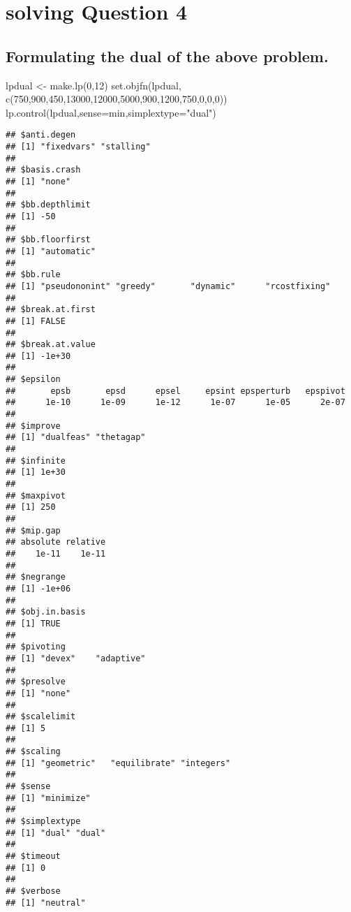 \documentclass[
]{article}
\newenvironment{Shaded}{\begin{snugshade}}{\end{snugshade}}
\newcommand{\AttributeTok}[1]{\textcolor[rgb]{0.77,0.63,0.00}{#1}}
\newcommand{\DecValTok}[1]{\textcolor[rgb]{0.00,0.00,0.81}{#1}}
\newcommand{\FunctionTok}[1]{\textcolor[rgb]{0.00,0.00,0.00}{#1}}
\newcommand{\NormalTok}[1]{#1}
\newcommand{\OtherTok}[1]{\textcolor[rgb]{0.56,0.35,0.01}{#1}}
\newcommand{\StringTok}[1]{\textcolor[rgb]{0.31,0.60,0.02}{#1}}
\begin{document}
\hypertarget{solving-question-4}{%
\section{solving Question 4}\label{solving-question-4}}

\hypertarget{formulating-the-dual-of-the-above-problem.}{%
\subsection{Formulating the dual of the above
problem.}\label{formulating-the-dual-of-the-above-problem.}}

\begin{Shaded}
\begin{Highlighting}[]
\NormalTok{lpdual }\OtherTok{\textless{}{-}} \FunctionTok{make.lp}\NormalTok{(}\DecValTok{0}\NormalTok{,}\DecValTok{12}\NormalTok{)}
\FunctionTok{set.objfn}\NormalTok{(lpdual, }\FunctionTok{c}\NormalTok{(}\DecValTok{750}\NormalTok{,}\DecValTok{900}\NormalTok{,}\DecValTok{450}\NormalTok{,}\DecValTok{13000}\NormalTok{,}\DecValTok{12000}\NormalTok{,}\DecValTok{5000}\NormalTok{,}\DecValTok{900}\NormalTok{,}\DecValTok{1200}\NormalTok{,}\DecValTok{750}\NormalTok{,}\DecValTok{0}\NormalTok{,}\DecValTok{0}\NormalTok{,}\DecValTok{0}\NormalTok{))}
\FunctionTok{lp.control}\NormalTok{(lpdual,}\AttributeTok{sense=}\StringTok{\textquotesingle{}min\textquotesingle{}}\NormalTok{,}\AttributeTok{simplextype=}\StringTok{"dual"}\NormalTok{)}
\end{Highlighting}
\end{Shaded}

\begin{verbatim}
## $anti.degen
## [1] "fixedvars" "stalling" 
## 
## $basis.crash
## [1] "none"
## 
## $bb.depthlimit
## [1] -50
## 
## $bb.floorfirst
## [1] "automatic"
## 
## $bb.rule
## [1] "pseudononint" "greedy"       "dynamic"      "rcostfixing" 
## 
## $break.at.first
## [1] FALSE
## 
## $break.at.value
## [1] -1e+30
## 
## $epsilon
##       epsb       epsd      epsel     epsint epsperturb   epspivot 
##      1e-10      1e-09      1e-12      1e-07      1e-05      2e-07 
## 
## $improve
## [1] "dualfeas" "thetagap"
## 
## $infinite
## [1] 1e+30
## 
## $maxpivot
## [1] 250
## 
## $mip.gap
## absolute relative 
##    1e-11    1e-11 
## 
## $negrange
## [1] -1e+06
## 
## $obj.in.basis
## [1] TRUE
## 
## $pivoting
## [1] "devex"    "adaptive"
## 
## $presolve
## [1] "none"
## 
## $scalelimit
## [1] 5
## 
## $scaling
## [1] "geometric"   "equilibrate" "integers"   
## 
## $sense
## [1] "minimize"
## 
## $simplextype
## [1] "dual" "dual"
## 
## $timeout
## [1] 0
## 
## $verbose
## [1] "neutral"
\end{verbatim}
\end{document}
